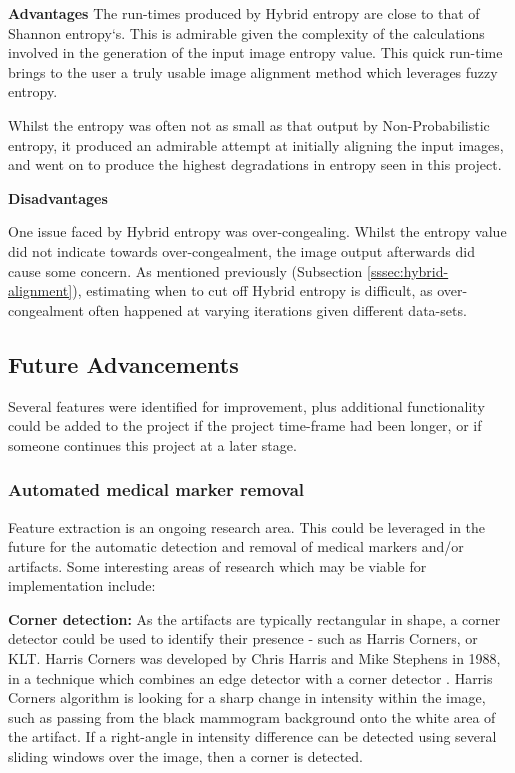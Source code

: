 \textbf{Advantages}
The run-times produced by Hybrid entropy are close to that of Shannon entropy`s. This is admirable given the complexity of the calculations involved in the generation of the input image entropy value. This quick run-time brings to the user a truly usable image alignment method which leverages fuzzy entropy.

Whilst the entropy was often not as small as that output by Non-Probabilistic entropy, it produced an admirable attempt at initially aligning the input images, and went on to produce the highest degradations in entropy seen in this project.

\textbf{Disadvantages}

One issue faced by Hybrid entropy was over-congealing. Whilst the entropy value did not indicate towards over-congealment, the image output afterwards did cause some concern. As mentioned previously (Subsection \ref{sssec:hybrid-alignment}), estimating when to cut off Hybrid entropy is difficult, as over-congealment often happened at varying iterations given different data-sets.

\subsection{Future Advancements}

Several features were identified for improvement, plus additional functionality could be added to the project if the project time-frame had been longer, or if someone continues this project at a later stage.

\subsubsection{Automated medical marker removal}
Feature extraction is an ongoing research area. This could be leveraged in the future for the automatic detection and removal of medical markers and/or artifacts. Some interesting areas of research which may be viable for implementation include:

\noindent \textbf{Corner detection: } As the artifacts are typically rectangular in shape, a corner detector could be used to identify their presence - such as Harris Corners, or KLT. Harris Corners was developed by Chris Harris and Mike Stephens in 1988, in a technique which combines an edge detector with a corner detector \cite{Harris_Stephens_1988}. Harris Corners algorithm is looking for a sharp change in intensity within the image, such as passing from the black mammogram background onto the white area of the artifact. If a right-angle in intensity difference can be detected using several sliding windows over the image, then a corner is detected.

